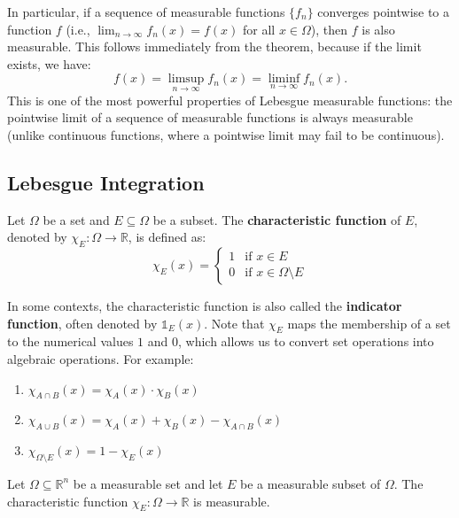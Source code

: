\begin{remark}
    In particular, if a sequence of measurable functions $\{f_n\}$ converges pointwise to a function $f$ (i.e., $\lim_{n \to \infty} f_n(x) = f(x)$ for all $x \in \Omega$), then $f$ is also measurable. This follows immediately from the theorem, because if the limit exists, we have:
    \[ f(x) = \limsup_{n \to \infty} f_n(x) = \liminf_{n \to \infty} f_n(x). \]
    This is one of the most powerful properties of Lebesgue measurable functions: the pointwise limit of a sequence of measurable functions is always measurable (unlike continuous functions, where a pointwise limit may fail to be continuous).
\end{remark}


\subsection{Lebesgue Integration}

\begin{definition}
    Let $\Omega$ be a set and $E \subseteq \Omega$ be a subset. The \textbf{characteristic function} of $E$, denoted by $\chi_E: \Omega \rightarrow \mathbb{R}$, is defined as:
    \[ 
    \chi_E(x) = \begin{cases} 
    1 & \text{if } x \in E \\ 
    0 & \text{if } x \in \Omega \setminus E 
    \end{cases}
    \]
\end{definition}

\begin{remark}
    In some contexts, the characteristic function is also called the \textbf{indicator function}, often denoted by $\mathds{1}_E(x)$. Note that $\chi_E$ maps the membership of a set to the numerical values $1$ and $0$, which allows us to convert set operations into algebraic operations. For example:
    \begin{enumerate}
        \item $\chi_{A \cap B}(x) = \chi_A(x) \cdot \chi_B(x)$
        \item $\chi_{A \cup B}(x) = \chi_A(x) + \chi_B(x) - \chi_{A \cap B}(x)$
        \item $\chi_{\Omega \setminus E}(x) = 1 - \chi_E(x)$
    \end{enumerate}
\end{remark}

\begin{proposition}
    Let $\Omega \subseteq \mathbb{R}^n$ be a measurable set and let $E$ be a measurable subset of $\Omega$. The characteristic function $\chi_E : \Omega \rightarrow \mathbb{R}$ is measurable.
\end{proposition}

